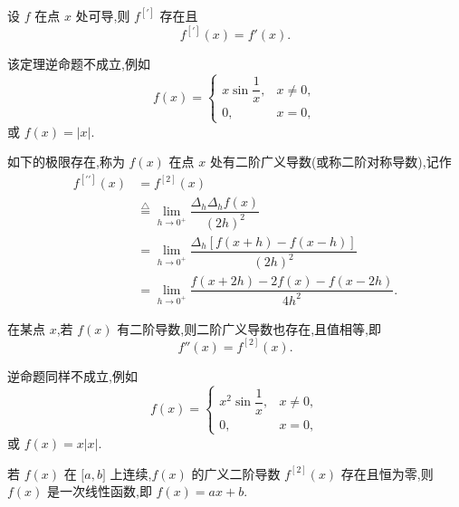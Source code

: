 \begin{theorem}[\markstar]
    设 $f$ 在点 $x$ 处可导,则 $f^{[\prime]}$ 存在且
    \[
        f^{[\prime]}(x)=f'(x).
    \]
\end{theorem}

\begin{remark}
    该定理逆命题不成立,例如
    \[
        f(x)=
        \begin{cases}
            x\sin\dfrac{1}{x}, & x\neq0, \\
            0,                 & x=0,
        \end{cases}
    \]
    或 $f(x)=|x|$.
\end{remark}

\begin{definition}
    如下的极限存在,称为 $f(x)$ 在点 $x$ 处有二阶广义导数(或称二阶对称导数),记作
    \[
        \begin{aligned}
            f^{[\prime\prime]}(x)
             & =f^{[2]}(x)                                            \\
             & \overset{\triangle}{=}
            \lim\limits_{h\to0^+}\dfrac{\Delta_h\Delta_hf(x)}{(2h)^2} \\
             & =\lim\limits_{h\to0^+}
            \dfrac{\Delta_h[f(x+h)-f(x-h)]}{(2h)^2}                   \\
             & =\lim\limits_{h\to0^+}
            \dfrac{f(x+2h)-2f(x)-f(x-2h)}{4h^2}.
        \end{aligned}
    \]
\end{definition}

\begin{theorem}[\markstar]
    在某点 $x$,若 $f(x)$ 有二阶导数,则二阶广义导数也存在,且值相等,即
    \[
        f''(x)=f^{[2]}(x).
    \]
\end{theorem}

\begin{remark}
    逆命题同样不成立,例如
    \[
        f(x)=
        \begin{cases}
            x^2\sin\dfrac{1}{x}, & x\neq0, \\
            0,                   & x=0,
        \end{cases}
    \]
    或 $f(x)=x|x|$.
\end{remark}

\begin{example}
    若 $f(x)$ 在 $\lbrack a,b\rbrack$ 上连续,$f(x)$ 的广义二阶导数 $f^{[2]}(x)$ 存在且恒为零,则 $f(x)$ 是一次线性函数,即 $f(x)=ax+b$.
\end{example}
\exampleblank

